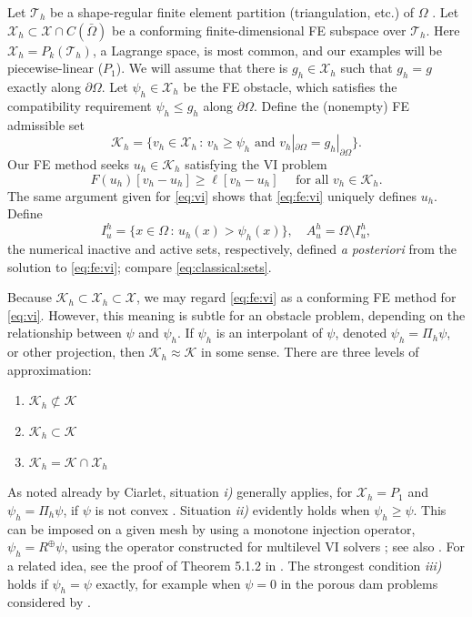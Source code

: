 \documentclass[]{interact}
\theoremstyle{plain}%
\theoremstyle{definition}
\theoremstyle{remark}
\newcommand{\cK}{\mathcal{K}}
\newcommand{\cT}{\mathcal{T}}
\newcommand{\cX}{\mathcal{X}}
\begin{document}
Let $\cT_h$ be a shape-regular finite element partition (triangulation, etc.) of $\Omega$ \cite{AinsworthOden2000,ElmanSilvesterWathen2014}.  Let $\cX_h \subset \cX \cap C(\bar\Omega)$ be a conforming finite-dimensional FE subspace over $\cT_h$.  Here $\cX_h = P_k(\cT_h)$, a Lagrange space, is most common, and our examples will be piecewise-linear ($P_1$).  We will assume that there is $g_h\in\cX_h$ such that $g_h=g$ exactly along $\partial \Omega$.  Let $\psi_h \in \cX_h$ be the FE obstacle, which satisfies the compatibility requirement $\psi_h \le g_h$ along $\partial\Omega$.  Define the (nonempty) FE admissible set
\begin{equation} \label{eq:fe:admissible}
\cK_h = \{v_h \in \cX_h \,:\, v_h \ge \psi_h \text{ and } v_h|_{\partial \Omega} = g_h|_{\partial\Omega}\}.
\end{equation}
Our FE method seeks $u_h\in\cK_h$ satisfying the VI problem
\begin{equation} \label{eq:fe:vi}
F(u_h)[v_h - u_h] \ge \ell[v_h - u_h] \quad \text{ for all } v_h \in \cK_h.
\end{equation}
The same argument given for \eqref{eq:vi} shows that \eqref{eq:fe:vi} uniquely defines $u_h$.  Define
\begin{equation}
  I_u^h = \{x \in \Omega \,:\, u_h(x) > \psi_h(x)\}, \quad A_u^h = \Omega \setminus I_u^h, \label{eq:fe:sets}
\end{equation}
the numerical inactive and active sets, respectively, defined \emph{a posteriori} from the solution to \eqref{eq:fe:vi}; compare \eqref{eq:classical:sets}.

Because $\cK_h \subset \cX_h \subset \cX$, we may regard \eqref{eq:fe:vi} as a conforming FE method for \eqref{eq:vi}.  However, this meaning is subtle for an obstacle problem, depending on the relationship between $\psi$ and $\psi_h$.  If $\psi_h$ is an interpolant of $\psi$, denoted $\psi_h = \Pi_h \psi$, or other projection, then $\cK_h \approx \cK$ in some sense.  There are three levels of approximation:
\renewcommand{\labelenumi}{\emph{\roman{enumi})}}
\begin{enumerate}
\item $\cK_h \not \subset \cK$
\item $\cK_h \subset \cK$
\item $\cK_h = \cK \cap \cX_h$
\end{enumerate}
As noted already by Ciarlet, situation \emph{i)} generally applies, for $\cX_h=P_1$ and $\psi_h = \Pi_h \psi$, if $\psi$ is not convex \cite[Figure 5.1.3]{Ciarlet2002}.  Situation \emph{ii)} evidently holds when $\psi_h \ge \psi$.  This can be imposed on a given mesh by using a monotone injection operator, $\psi_h = R^\oplus \psi$, using the operator constructed for multilevel VI solvers \cite{BuelerFarrell2024}; see also \cite{GraeserKornhuber2009}.  For a related idea, see the proof of Theorem 5.1.2 in \cite{Ciarlet2002}.  The strongest condition \emph{iii)} holds if $\psi_h=\psi$ exactly, for example when $\psi=0$ in the porous dam problems considered by \cite{AinsworthOdenLee1993}.
\end{document}
